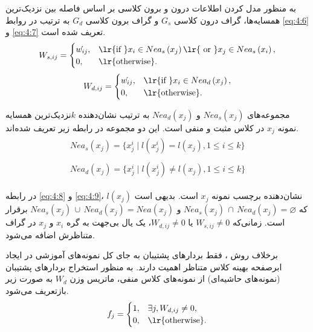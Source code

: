 به منظور مدل کردن اطلاعات درون و برون کلاسی بر اساس فاصله بین نزدیک‌ترین همسایه‌ها، گراف درون کلاسی $G_{s}$ و گراف برون کلاسی $G_{d}$ به ترتیب در روابط \ref{eq:4:6} و \ref{eq:4:7} تعریف شده است.
\begin{equation}\label{eq:4:6}
W_{s,ij} =
\begin{cases}
\acute{w_{ij}}, & \textrm{\lr{if }} x_{i} \in Nea_{s}\left(x_{j}\right) \textrm{\lr{ or }} x_j \in Nea_{s}\left(x_i\right), \\
0, & \textrm{\lr{otherwise}}.
\end{cases}
\end{equation}
\begin{equation}\label{eq:4:7}
W_{d,ij} =
\begin{cases}
\acute{w_{ij}}, & \textrm{\lr{if }} x_{i} \in Nea_{d}\left(x_{j}\right), \\
0, & \textrm{\lr{otherwise}}.
\end{cases}
\end{equation}

مجموعه‌های $Nea_{s}\left(x_{j}\right)$ و $Nea_{d}\left(x_{j}\right)$ به ترتیب نشان‌دهنده  $k$نزدیک‌ترین همسایه نمونه $x_{j}$  در کلاس مثبت و منفی است. این دو مجموعه در رابطه زیر تعریف شده‌اند.
\begin{align}
\label{eq:4:8}
\begin{split}
Nea_{s}\left(x_j\right) = \{x^{i}_{j} \mid l(x^{i}_{j}) = l(x_{j}), 1 \leq i \leq k \}
\end{split}\\
\label{eq:4:9}
\begin{split}
Nea_{d}\left(x_j\right) = \{x^{i}_{j} \mid l(x^{i}_{j}) \neq l(x_{j}), 1 \leq i \leq k \}
\end{split}
\end{align}

در رابطه \ref{eq:4:8} و \ref{eq:4:9}، $l(x_{j})$  نشان‌دهنده برچسب نمونه $x_{j}$ است. بدیهی است که  $Nea_{s}(x_j)\,\cap\, Nea_{d}(x_j)= \varnothing$ و $Nea_{s}(x_j)\, \cup \, Nea_{d}(x_j) = Nea(x_j)$  برقرار است. زمانی‌که  $W_{s,ij} \neq 0$ یا  $W_{d,ij} \neq 0$، یک یال بی‌جهت به گره $x_{i}$ و $x_{j}$  در گراف متناظرش اضافه می‌شود.

برخلاف روش ، فقط بردار‌های پشتیبان به جای کل نمونه‌های آموزشی در ایجاد ابرصفحه بهینه کلاس متناظر اهمیت دارند. به منظور استخراج بردار‌های پشتیبان (نمونه‌های حاشیه‌ای) از نمونه‌های کلاس منفی، ماتریس وزن  $W_{d}$ به صورت زیر بازتعریف می‌شود.
\begin{equation}\label{eq:4:10}
f_{j} =
\begin{cases}
1, & \exists j, W_{d,ij} \neq 0,  \\
0, & \textrm{\lr{otherwise}}.
\end{cases}
\end{equation}

